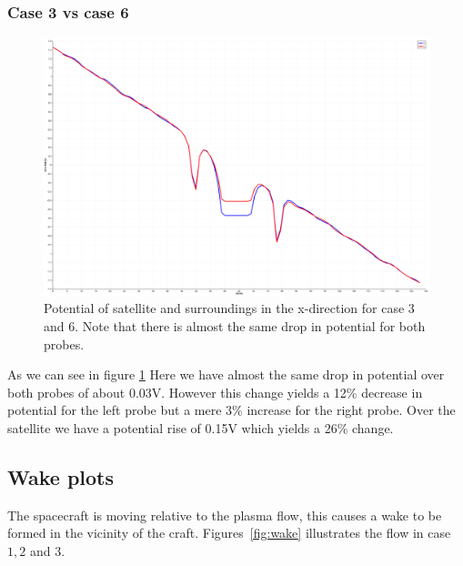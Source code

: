 \subsubsection{Case 3 vs case 6}

\begin{figure}
    \centering
    \includegraphics[width = 0.6 \textwidth]{images/pot_case36_new.png}
    \caption{Potential of satellite and surroundings in the x-direction for case 3 and 6. Note that there is almost the same drop in potential for both probes.}
    \label{fig:pot_case36}
\end{figure}

As we can see in figure \ref{fig:pot_case36} Here we have almost the same drop in potential over both probes of about 0.03V. However this change yields a 12\% decrease in potential for the left probe but a mere 3\% increase for the right probe. Over the satellite we have a potential rise of 0.15V which yields a 26\% change.

\subsection{Wake plots}
	The spacecraft is moving relative to the plasma flow, this causes a wake to be formed in the vicinity of the craft.
 	Figures~\ref{fig:wake} illustrates the flow in case \(1,2\) and \(3\).

